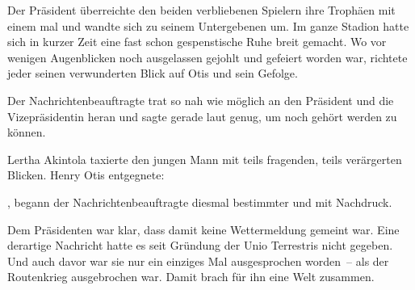 \par

Der Präsident überreichte den beiden verbliebenen Spielern ihre Trophäen mit einem mal und wandte sich zu seinem Untergebenen um. Im ganze Stadion hatte sich in kurzer Zeit eine fast schon gespenstische Ruhe breit gemacht. Wo vor wenigen Augenblicken noch ausgelassen gejohlt und gefeiert worden war, richtete jeder seinen verwunderten Blick auf Otis und sein Gefolge.

\par

Der Nachrichtenbeauftragte trat so nah wie möglich an den Präsident und die Vizepräsidentin heran und sagte gerade laut genug, um noch gehört werden zu können. 

\par

Lertha Akintola taxierte den jungen Mann mit teils fragenden, teils verärgerten Blicken. Henry Otis entgegnete: 

\par

, begann der Nachrichtenbeauftragte diesmal bestimmter und mit Nachdruck. 

\par

Dem Präsidenten war klar, dass damit keine Wettermeldung gemeint war. Eine derartige Nachricht hatte es seit Gründung der Unio Terrestris nicht gegeben. Und auch davor war sie nur ein einziges Mal ausgesprochen worden~-- als der Routenkrieg ausgebrochen war. Damit brach für ihn eine Welt zusammen.

